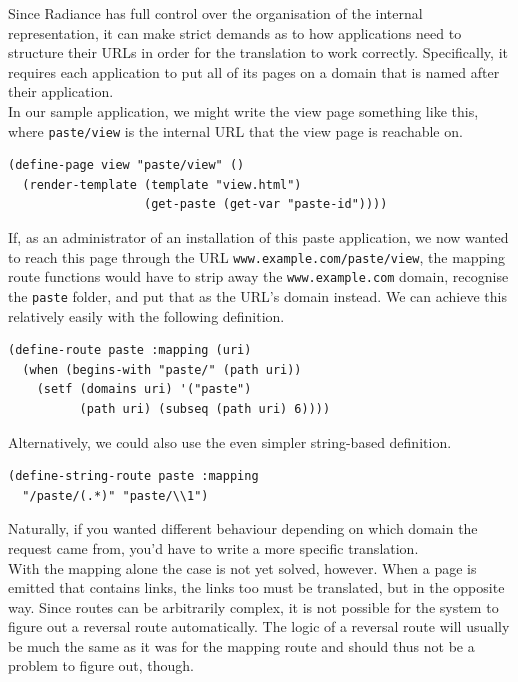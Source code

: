 \documentclass{sig-alternate}
\begin{document}
Since Radiance has full control over the organisation of the internal representation, it can make strict demands as to how applications need to structure their URLs in order for the translation to work correctly. Specifically, it requires each application to put all of its pages on a domain that is named after their application. \\

In our sample application, we might write the view page something like this, where \texttt{paste/view} is the internal URL that the view page is reachable on.

\begin{verbatim}
(define-page view "paste/view" ()
  (render-template (template "view.html")
                   (get-paste (get-var "paste-id"))))
\end{verbatim}

If, as an administrator of an installation of this paste application, we now wanted to reach this page through the URL \texttt{www.example.com/paste/view}, the mapping route functions would have to strip away the \texttt{www.example.com} domain, recognise the \texttt{paste} folder, and put that as the URL's domain instead. We can achieve this relatively easily with the following definition.

\begin{verbatim}
(define-route paste :mapping (uri)
  (when (begins-with "paste/" (path uri))
    (setf (domains uri) '("paste")
          (path uri) (subseq (path uri) 6))))
\end{verbatim}

Alternatively, we could also use the even simpler string-based definition.

\begin{verbatim}
(define-string-route paste :mapping
  "/paste/(.*)" "paste/\\1")
\end{verbatim}

Naturally, if you wanted different behaviour depending on which domain the request came from, you'd have to write a more specific translation. \\

With the mapping alone the case is not yet solved, however. When a page is emitted that contains links, the links too must be translated, but in the opposite way. Since routes can be arbitrarily complex, it is not possible for the system to figure out a reversal route automatically. The logic of a reversal route will usually be much the same as it was for the mapping route and should thus not be a problem to figure out, though. \\
\end{document}
